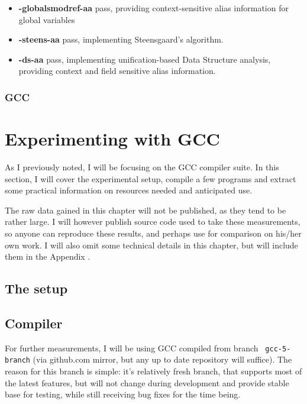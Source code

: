 \begin{itemize}
	\item {\bf -globalsmodref-aa} pass, providing context-sensitive alias
		information for global variables
	\item {\bf -steens-aa} pass, implementing Steensgaard's algorithm.
	\item {\bf -ds-aa} pass, implementing unification-based Data Structure
		analysis, providing context and field sensitive alias information.
\end{itemize}



\subsubsection{GCC}



\section{Experimenting with GCC}

As I previously noted, I will be focusing on the GCC compiler suite. In this
section, I will cover the experimental setup, compile a few programs and extract
some practical information on resources needed and anticipated use.

The raw data gained in this chapter will not be published, as they tend to be
rather large. I will however publish source code used to take these
measurements, so anyone can reproduce these results, and perhaps use for
comparison on his/her own work. I will also omit some technical details in this
chapter, but will include them in the Appendix .

\subsection{The setup}

\subsection{Compiler}

For further measurements, I will be using GCC compiled from branch {\tt
gcc-5-branch} (via github.com mirror, but any up to date repository will
suffice). The reason for this branch is simple: it's relatively fresh branch,
that supports most of the latest features, but will not change during
development and provide stable base for testing, while still receiving bug fixes
for the time being.

